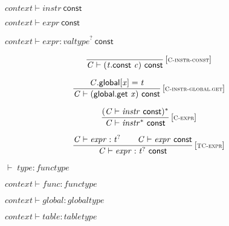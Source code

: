 \vspace{1ex}

$\boxed{{\mathit{context}} \vdash {\mathit{instr}}~\mathsf{const}}$

$\boxed{{\mathit{context}} \vdash {\mathit{expr}}~\mathsf{const}}$

$\boxed{{\mathit{context}} \vdash {\mathit{expr}} : {{\mathit{valtype}}^?}~\mathsf{const}}$

$$
\begin{array}{@{}c@{}}\displaystyle
\frac{
}{
{\mathit{C}} \vdash ({\mathit{t}}.\mathsf{const}~{\mathit{c}})~\mathsf{const}
} \, {[\textsc{\scriptsize C{-}instr{-}const}]}
\qquad
\end{array}
$$

$$
\begin{array}{@{}c@{}}\displaystyle
\frac{
{\mathit{C}}.\mathsf{global}[{\mathit{x}}] = {\mathit{t}}
}{
{\mathit{C}} \vdash (\mathsf{global.get}~{\mathit{x}})~\mathsf{const}
} \, {[\textsc{\scriptsize C{-}instr{-}global.get}]}
\qquad
\end{array}
$$

\vspace{1ex}

$$
\begin{array}{@{}c@{}}\displaystyle
\frac{
({\mathit{C}} \vdash {\mathit{instr}}~\mathsf{const})^\ast
}{
{\mathit{C}} \vdash {{\mathit{instr}}^\ast}~\mathsf{const}
} \, {[\textsc{\scriptsize C{-}expr}]}
\qquad
\end{array}
$$

\vspace{1ex}

$$
\begin{array}{@{}c@{}}\displaystyle
\frac{
{\mathit{C}} \vdash {\mathit{expr}} : {{\mathit{t}}^?}
 \qquad
{\mathit{C}} \vdash {\mathit{expr}}~\mathsf{const}
}{
{\mathit{C}} \vdash {\mathit{expr}} : {{\mathit{t}}^?}~\mathsf{const}
} \, {[\textsc{\scriptsize TC{-}expr}]}
\qquad
\end{array}
$$

\vspace{1ex}

$\boxed{{ \vdash }\;{\mathit{type}} : {\mathit{functype}}}$

$\boxed{{\mathit{context}} \vdash {\mathit{func}} : {\mathit{functype}}}$

$\boxed{{\mathit{context}} \vdash {\mathit{global}} : {\mathit{globaltype}}}$

$\boxed{{\mathit{context}} \vdash {\mathit{table}} : {\mathit{tabletype}}}$

